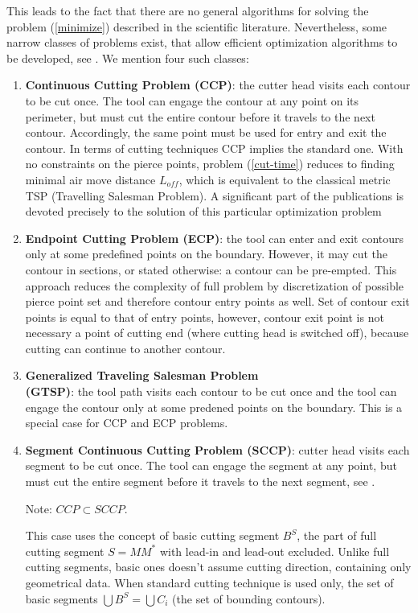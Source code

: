 \documentclass{ifacconf}
\begin{document}
This leads to the fact that
there are no general algorithms for solving the problem
(\ref{minimize})
described in the scientific literature.
Nevertheless,
some narrow classes of problems
exist,
that allow efficient optimization algorithms to be developed,
see \cite{dewil2012heuristics}.
We mention four such classes:

\begin{enumerate}
    \item \textbf{Continuous Cutting Problem (CCP)}:
    the cutter head visits each contour to be cut once.
    The tool can engage the contour at any point on its perimeter,
    but must cut the entire
    contour before it travels to the next contour.
    Accordingly, the same point must be used for
    entry and exit the contour.
    In terms of cutting techniques CCP implies the standard one.
    With no constraints on the pierce points,
    problem (\ref{cut-time}) reduces to finding minimal
    air move distance $L_{off}$,
    which is equivalent to the classical metric TSP
    (Travelling Salesman Problem).
    A significant part of the publications is devoted precisely
    to the solution of this particular optimization problem

    \item \textbf{Endpoint Cutting Problem (ECP)}:
    the tool can enter and exit contours only at some
    predefined points on the boundary.
    However, it may cut the contour in sections,
    or stated otherwise: a contour can be pre-empted.
    This approach reduces the complexity of full problem
    by discretization of possible pierce point set and therefore
    contour entry points as well.
    Set of contour exit points is equal to that of
    entry points, however,
    contour exit point is not necessary
    a point of cutting end
    (where cutting head is switched off),
    because cutting can continue to another contour.

    \item \textbf{Generalized Traveling Salesman Problem \\ (GTSP)}:
    the tool path visits each contour to be cut once
    and the tool can engage the contour only
    at some predened points on the boundary.
    This is a special case for CCP and ECP problems.

    \item \textbf{Segment Continuous Cutting Problem (SCCP)}:
    cutter head visits each segment to be cut once.
    The tool can engage the segment at any point,
    but must cut the entire segment before it travels to the next segment,
    see \cite{Petunin2015Nov}.

    Note: $CCP \subset SCCP$.

    This case uses the concept of basic cutting segment
    $B^S$, the part of full cutting segment
    $S = MM^*$ with lead-in and lead-out excluded.
    Unlike full cutting segments,
    basic ones doesn't assume cutting direction,
    containing only geometrical data.
    When standard cutting technique is used only,
    the set of basic segments $\bigcup B^S = \bigcup C_i$
    (the set of bounding contours).

\end{enumerate}
\end{document}
